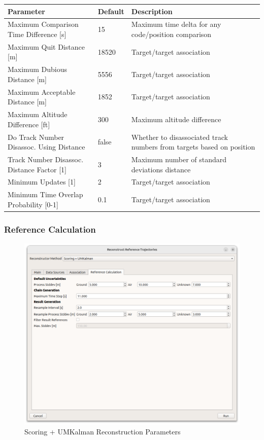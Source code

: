 \begin{table}[H]
  \center
  \begin{tabularx}{\textwidth}{ | l | l | X |}
    \hline
    \textbf{Parameter} & \textbf{Default} &  \textbf{Description} \\ \hline
    Maximum Comparison Time Difference [s] & 15 & Maximum time delta for any code/position comparison \\ \hline
    Maximum Quit Distance [m] & 18520 & Target/target association \\ \hline
    Maximum Dubious Distance [m] & 5556 & Target/target association \\ \hline
    Maximum Acceptable Distance [m] & 1852 & Target/target association \\ \hline
    Maximum Altitude Difference [ft] & 300 & Maximum altitude difference \\ \hline
    Do Track Number Disassoc. Using Distance & false & Whether to disassociated track numbers from targets based on position \\ \hline
    Track Number Disassoc. Distance Factor [1] & 3 & Maximum number of standard deviations distance \\ \hline
    Minimum Updates [1] & 2 & Target/target association \\ \hline
    Minimum Time Overlap Probability [0-1] & 0.1 & Target/target association \\ \hline
  \end{tabularx}
\end{table}

\subsubsection{Reference Calculation}

\begin{figure}[H]
    \center
      \includegraphics[width=16cm]{figures/dialog_ref_calc.png}
    \caption{Scoring + UMKalman Reconstruction Parameters}
\end{figure}

